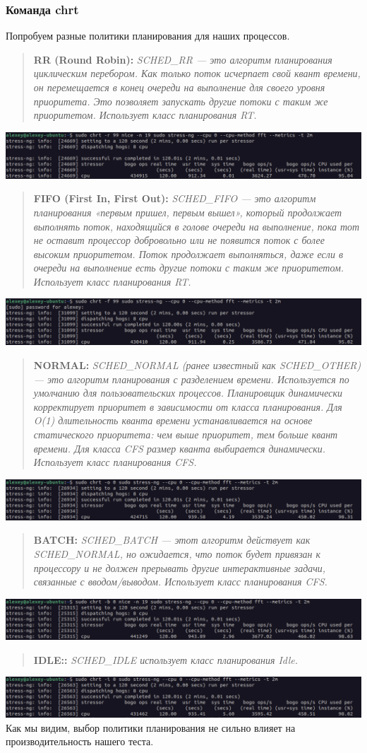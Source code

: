 \documentclass[12pt,onecolumn]{article}
\newcommand{\nquote}[2]{
  \begin{quote}
    \textbf{#1:}\textit{ #2}
  \end{quote}
}
\begin{document}
\subsubsection{Команда chrt}
Попробуем разные политики планирования для наших процессов.\\
\nquote{RR (Round Robin)}{SCHED\_RR — это алгоритм планирования циклическим перебором. Как только поток исчерпает свой квант времени, он перемещается в конец очереди на выполнение для своего уровня приоритета. Это позволяет запускать другие потоки с таким же приоритетом. Использует класс планирования RT.}
\includegraphics[width=\textwidth]{image/rr.png}
\nquote{FIFO (First In, First Out)}{SCHED\_FIFO — это алгоритм планирования «первым пришел, первым вышел», который продолжает выполнять поток, находящийся в голове очереди на выполнение, пока тот не оставит процессор добровольно или не появится поток с более высоким приоритетом. Поток продолжает выполняться, даже если в очереди на выполнение есть другие потоки с таким же приоритетом. Использует класс планирования RT.}
\includegraphics[width=\textwidth]{image/fifo.png}
\nquote{NORMAL}{SCHED\_NORMAL (ранее известный как SCHED\_OTHER) — это алгоритм планирования с разделением времени. Используется по умолчанию для пользовательских процессов. Планировщик динамически корректирует приоритет в зависимости от класса планирования. Для O(1) длительность кванта времени устанавливается на основе статического приоритета: чем выше приоритет, тем больше квант времени. Для класса CFS размер кванта выбирается динамически. Использует класс планирования CFS.}
\includegraphics[width=\textwidth]{image/normal.png}
\nquote{BATCH}{SCHED\_BATCH — этот алгоритм действует как SCHED\_NORMAL, но ожидается, что поток будет привязан к процессору и не должен прерывать другие интерактивные задачи, связанные с вводом/выводом. Использует класс планирования CFS.}
\includegraphics[width=\textwidth]{image/batch.png}
\nquote{IDLE:}{SCHED\_IDLE использует класс планирования Idle.}
\includegraphics[width=\textwidth]{image/idle.png}
Как мы видим, выбор политики планирования не сильно влияет на производительность нашего теста.
\end{document}
